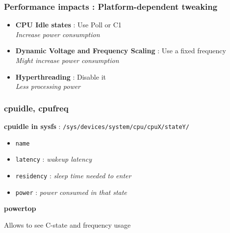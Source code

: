 \begin{frame}
	\frametitle{Performance impacts : Platform-dependent tweaking}
\begin{itemize}
	\item \textbf{CPU Idle states} : Use Poll or C1 \\ \small{\textit{Increase power consumption}}
	\vspace{0.3cm}
	\item \textbf{Dynamic Voltage and Frequency Scaling} : Use a fixed frequency \\ \small{\textit{Might increase power consumption}}
	\vspace{0.3cm}
	\item \textbf{Hyperthreading} : Disable it \\ \small{\textit{Less processing power}}
\end{itemize}
\end{frame}

\begin{frame}
	\frametitle{cpuidle, cpufreq}
	\textbf{cpuidle in sysfs} : \texttt{/sys/devices/system/cpu/cpuX/stateY/}
	\begin{itemize}
		\item \texttt{name}
		\item \texttt{latency} : \textit{wakeup latency}
		\item \texttt{residency} : \textit{sleep time needed to enter}
		\item \texttt{power} : \textit{power consumed in that state}
	\end{itemize}

	\vspace{1cm}
	\textbf{powertop}

	Allows to see C-state and frequency usage
\end{frame}


